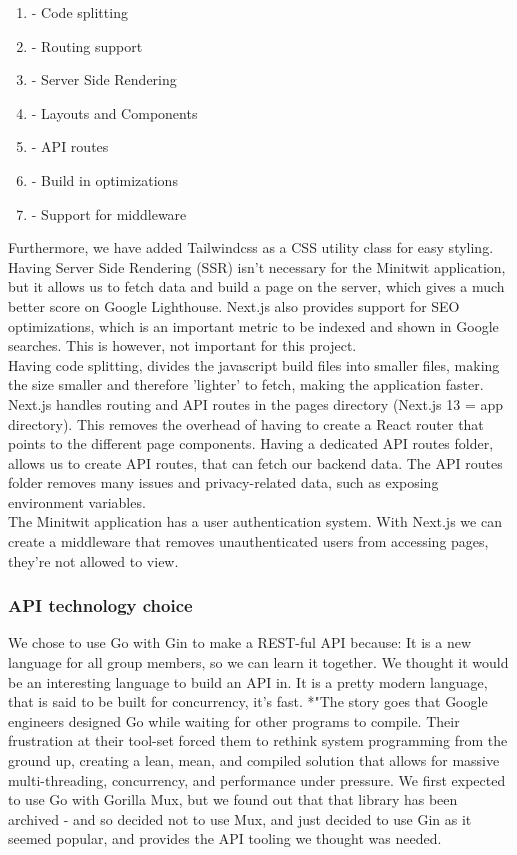 \begin{enumerate}
    \item - Code splitting
    \item - Routing support
    \item- Server Side Rendering
    \item- Layouts and Components
    \item- API routes
    \item- Build in optimizations
    \item- Support for middleware
\end{enumerate}
Furthermore, we have added Tailwindcss as a CSS utility class for easy styling.
Having Server Side Rendering (SSR) isn't necessary for the Minitwit application, but it allows us to fetch data and build a page on the server, which gives a much better score on Google Lighthouse. Next.js also provides support for SEO optimizations, which is an important metric to be indexed and shown in Google searches. This is however, not important for this project.
\\
Having code splitting, divides the javascript build files into smaller files, making the size smaller and therefore 'lighter' to fetch, making the application faster.
\\
Next.js handles routing and API routes in the pages directory (Next.js 13 = app directory). This removes the overhead of having to create a React router that points to the different page components. Having a dedicated API routes folder, allows us to create API routes, that can fetch our backend data. The API routes folder removes many issues and privacy-related data, such as exposing environment variables.
\\
The Minitwit application has a user authentication system. With Next.js we can create a middleware that removes unauthenticated users from accessing pages, they're not allowed to view.
\subsubsection{API technology choice}
We chose to use Go with Gin to make a REST-ful API because:
It is a new language for all group members, so we can learn it together. We thought it would be an interesting language to build an API in. It is a pretty modern language, that is said to be built for concurrency, it's fast.  
*"The story goes that Google engineers designed Go while waiting for other programs to compile. Their frustration at their tool-set forced them to rethink system programming from the ground up, creating a lean, mean, and compiled solution that allows for massive multi-threading, concurrency, and performance under pressure\cite{stackoverflow2020golang}.
We first expected to use Go with Gorilla Mux, but we found out that that library has been archived - and so decided not to use Mux, and just decided to use Gin as it seemed popular, and provides the API tooling we thought was needed.

